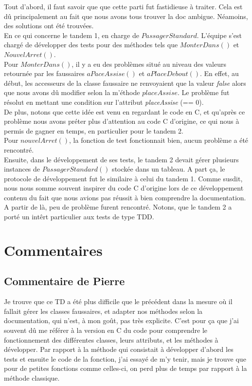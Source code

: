 \documentclass[a4paper,11pts]{article}
\begin{document}
Tout d'abord, il faut savoir que que cette parti fut fastidieuse à traiter. Cela est d\^u principalement au fait que nous avons tous trouver la doc ambig\¨ue. Néamoins, des solutions ont été trouvées. \\
En ce qui concerne le tandem 1, en charge de $PassagerStandard$. L'équipe s'est chargé de développer des tests pour des méthodes tels que $MonterDans()$ et $NouvelArret()$.\\
Pour $MonterDans()$, il y a eu des problèmes situé au niveau des valeurs retournée par les faussaires $aPaceAssise()$ et $aPlaceDebout()$. En effet, au début, les accesseurs de la classe faussaire ne renvoyaient que la valeur \textit{false} alors que nous avons d\^u modifier selon la m'éthode $placeAssise$. Le problème fut résolut en mettant une condition sur l'attribut \textit{placeAssise} (== 0). \\De plus, notons que cette idée est venu en regardant le code en C, et qu'après ce problème nous avons préter plus d'attention au code C d'origine, ce qui nous à permis de gagner en temps, en particulier pour le tandem 2.\\
Pour $nouvelArret()$, la fonction de test fonctionnait bien, aucun problème a été rencontré.
\\
Ensuite, dans le développement de ses tests, le tandem 2 devait gérer plusieurs instances de $PassagerStandard()$ stockée dans un tableau. A part ça, le protocole de développement fut le similaire à celui du tandem 1. Comme susdit, nous nous somme souvent inspirer du code C d'origine lors de ce développement contenu du fait que nous avions pas réussit à  bien comprendre la documentation. A partir de là, peu de problème furent rencontré. Notons, que le tandem 2 a porté un int\^ert particulier aux tests de type TDD.




\section{Commentaires}
\subsection{Commentaire de Pierre}
Je trouve que ce TD a été plus difficile que le précédent dans la mesure où il fallait gérer les classes faussaires, et adapter nos méthodes selon la documentation, qui n'est, à mon goût, pas très explicite. C'est pour ça que j'ai souvent dû me référer à la version en C du code pour comprendre le fonctionnement des différentes classes, leurs attributs, et les méthodes à développer. Par rapport à la méthode qui consistait à développer d'abord les tests et ensuite le code de la fonction, j'ai essayé de m'y tenir, mais je trouve que pour de petites fonctions comme celles-ci, on perd plus de temps par rapport à la méthode classique.
\end{document}
